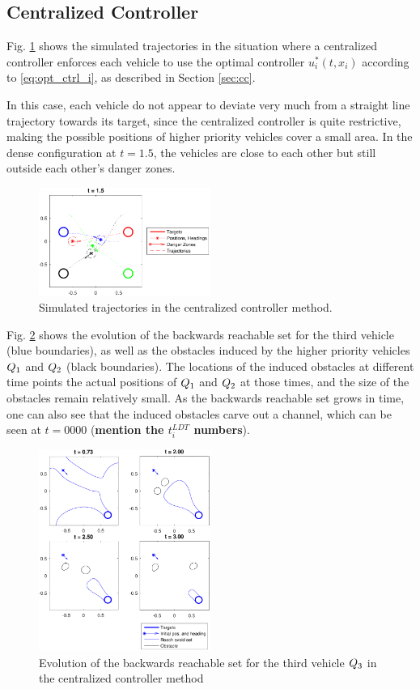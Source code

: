 \subsection{Centralized Controller}
Fig. \ref{fig:cc_traj} shows the simulated trajectories in the situation where a centralized controller enforces each vehicle to use the optimal controller $u^*_i(t, x_i)$ according to \eqref{eq:opt_ctrl_i}, as described in Section \ref{sec:cc}.

In this case, each vehicle do not appear to deviate very much from a straight line trajectory towards its target, since the centralized controller is quite restrictive, making the possible positions of higher priority vehicles cover a small area. In the dense configuration at $t=1.5$, the vehicles are close to each other but still outside each other's danger zones.

\begin{figure}
  \centering
  \includegraphics[width=0.5\textwidth]{"fig/cc_traj"}
  \caption{Simulated trajectories in the centralized controller method.}
  \label{fig:cc_traj}
\end{figure}

Fig. \ref{fig:cc_rs3} shows the evolution of the backwards reachable set for the third vehicle (blue boundaries), as well as the obstacles induced by the higher priority vehicles $Q_1$ and $Q_2$ (black boundaries). The locations of the induced obstacles at different time points the actual positions of $Q_1$ and $Q_2$ at those times, and the size of the obstacles remain relatively small. As the backwards reachable set grows in time, one can also see that the induced obstacles carve out a channel, which can be seen at $t = 0000$ (\textbf{mention the $t_i^{LDT}$ numbers}).

\begin{figure}
  \centering
  \includegraphics[width=0.5\textwidth]{"fig/cc_rs3"}
  \caption{Evolution of the backwards reachable set for the third vehicle $Q_3$ in the centralized controller method}
  \label{fig:cc_rs3}
\end{figure}

